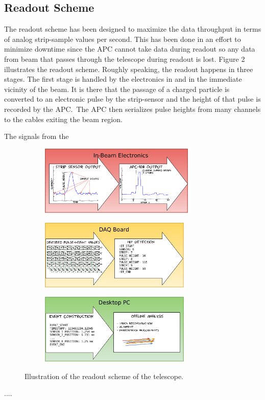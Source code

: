 \documentclass{PoS}
\begin{document}
\subsection{Readout Scheme}
The readout scheme has been designed to maximize the data throughput in terms
of analog strip-sample values per second. This has been done in an effort to
minimize downtime since the APC cannot take data during readout so any data
from beam that passes through the telescope during readout is lost. Figure 2
illustrates the readout scheme. Roughly speaking, the readout happens in three
stages. The first stage is handled by the electronics in and in the immediate
vicinity of the beam. It is there that the passage of a charged particle is
converted to an electronic pulse by the strip-sensor and the height of that
pulse is recorded by the APC.\ The APC then serializes pulse heights from many
channels to the cables exiting the beam region.

The signals from the 
\begin{figure}[h]
  \centering
  \begin{subfigure}[b]{0.49\textwidth}
    \includegraphics[height=1.32in]{../figures/Telescope_Data_Flow_Stage_I.pdf}
  \end{subfigure}
  \begin{subfigure}[b]{0.49\textwidth}
    \includegraphics[height=1.32in]{../figures/Telescope_Data_Flow_Stage_II.pdf}
  \end{subfigure}
  \begin{subfigure}[b]{0.49\textwidth}
    \includegraphics[height=1.32in]{../figures/Telescope_Data_Flow_Stage_III.pdf}
  \end{subfigure}
  \caption{Illustration of the readout scheme of the telescope.}
\end{figure}


\begin{thebibliography}{99}
....

\end{thebibliography}
\end{document}
